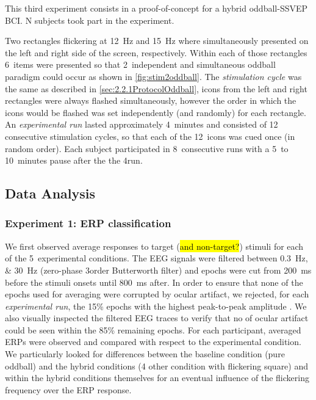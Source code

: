\documentclass[10pt]{article}
\begin{document}
        This third experiment consists in a proof-of-concept for a hybrid oddball-\ac{SSVEP} \ac{BCI}.
        N subjects took part in the experiment.

        Two rectangles flickering at \SI{12}{\Hz} and \SI{15}{\Hz} where simultaneously presented on the left and right side of the screen, respectively.
        Within each of those rectangles 6~items were presented so that 2~independent and simultaneous oddball paradigm could occur as shown in \autoref{fig:stim2oddball}.
        The \emph{stimulation cycle} was the same as described in \autoref{sec:2.2.1ProtocolOddball}, icons from the left and right rectangles were always flashed simultaneously, however the order in which the icons would be flashed was set independently (and randomly) for each rectangle.
        An \emph{experimental run} lasted approximately 4~minutes and consisted of 12 consecutive stimulation cycles, so that each of the 12~icons was cued once (in random order).
        Each subject participated in 8~consecutive runs with a 5~to 10~minutes pause after the the 4\nth run.


    \subsection{Data Analysis}
    \label{sec:2.3DataAnalysis}

        \subsubsection{Experiment 1: \acs{ERP} classification}
        \label{sec:2.3.1AnalysisExp1}

        We first observed average responses to target (\hl{and non-target?}) stimuli for each of the 5~experimental conditions.
        The \ac{EEG} signals were filtered between \SIlist[list-units = single]{0.3;30}{\Hz} (zero-phase 3\rd order Butterworth filter) and epochs were cut from \SI{200}{\ms} before the stimuli onsets until \SI{800}{\ms} after.
        In order to ensure that none of the epochs used for averaging were corrupted by ocular artifact, we rejected, for each \emph{experimental run}, the 15\% epochs with the highest peak-to-peak amplitude \parencite{Luck2005}.
        We also visually inspected the filtered \ac{EEG} traces to verify that no of ocular artifact could be seen within the 85\% remaining epochs.
        For each participant, averaged \acp{ERP} were observed and compared with respect to the experimental condition.
        We particularly looked for differences between the baseline condition (pure oddball) and the hybrid conditions (4 other condition with flickering square) and within the hybrid conditions themselves for an eventual influence of the flickering frequency over the \ac{ERP} response.
\end{document}
